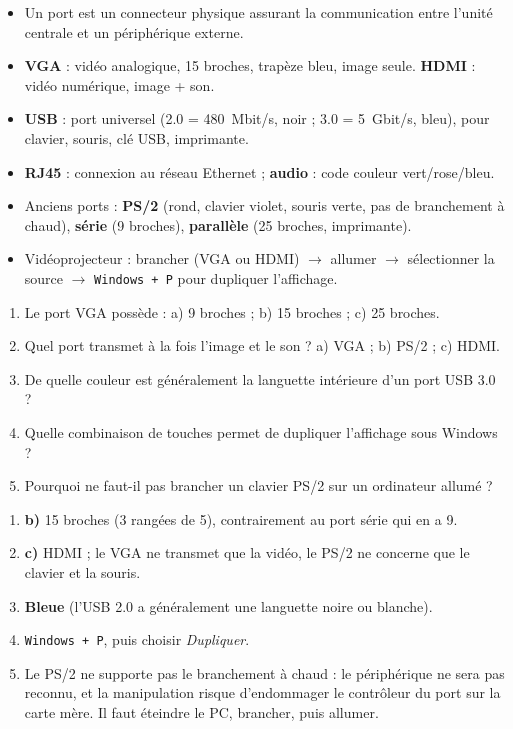 \documentclass[11pt]{article}
\newcommand{\cle}[1]{{\popxbold\color{popdark}#1}}
\begin{document}
\begin{aretenir}
\begin{itemize}
  \item Un \cle{port} est un connecteur physique assurant la communication entre l'unité centrale et un périphérique externe.
  \item \textbf{VGA} : vidéo analogique, 15 broches, trapèze bleu, image seule. \textbf{HDMI} : vidéo numérique, image + son.
  \item \textbf{USB} : port universel (2.0 = \SI{480}{Mbit/s}, noir ; 3.0 = \SI{5}{Gbit/s}, bleu), pour clavier, souris, clé USB, imprimante.
  \item \textbf{RJ45} : connexion au réseau Ethernet ; \textbf{audio} : code couleur vert/rose/bleu.
  \item Anciens ports : \textbf{PS/2} (rond, clavier violet, souris verte, pas de branchement à chaud), \textbf{série} (9 broches), \textbf{parallèle} (25 broches, imprimante).
  \item Vidéoprojecteur : brancher (VGA ou HDMI) $\rightarrow$ allumer $\rightarrow$ sélectionner la source $\rightarrow$ \texttt{Windows + P} pour dupliquer l'affichage.
\end{itemize}
\end{aretenir}

\begin{exercice}
\begin{enumerate}
  \item Le port VGA possède : a) 9 broches ; b) 15 broches ; c) 25 broches.
  \item Quel port transmet à la fois l'image et le son ? a) VGA ; b) PS/2 ; c) HDMI.
  \item De quelle couleur est généralement la languette intérieure d'un port USB 3.0 ?
  \item Quelle combinaison de touches permet de dupliquer l'affichage sous Windows ?
  \item Pourquoi ne faut-il pas brancher un clavier PS/2 sur un ordinateur allumé ?
\end{enumerate}
\end{exercice}

\begin{corrige}[Exercice n°1]
\begin{enumerate}
  \item \textbf{b)} 15 broches (3 rangées de 5), contrairement au port série qui en a 9.
  \item \textbf{c)} HDMI ; le VGA ne transmet que la vidéo, le PS/2 ne concerne que le clavier et la souris.
  \item \textbf{Bleue} (l'USB 2.0 a généralement une languette noire ou blanche).
  \item \texttt{Windows + P}, puis choisir \emph{Dupliquer}.
  \item Le PS/2 ne supporte pas le branchement à chaud : le périphérique ne sera pas reconnu, et la manipulation risque d'endommager le contrôleur du port sur la carte mère. Il faut éteindre le PC, brancher, puis allumer.
\end{enumerate}
\end{corrige}
\end{document}
